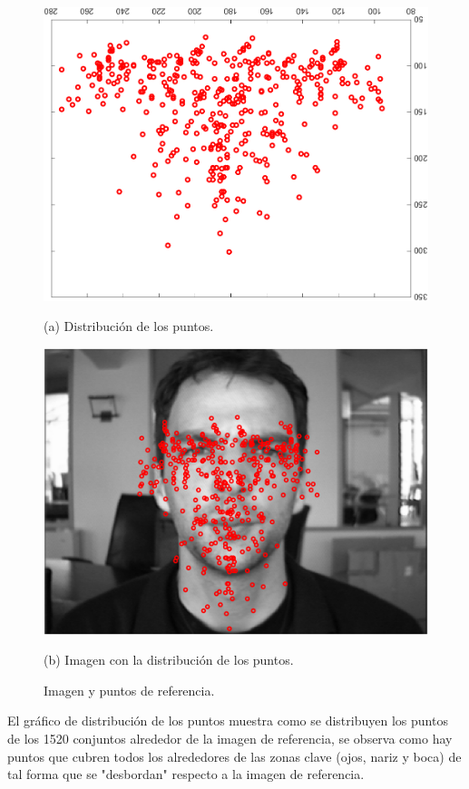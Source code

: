\documentclass[11pt, letterpaper]{article}
\begin{document}
\begin{figure}[h!]
	\centering
	\begin{minipage}{0.4\textwidth}
		\centering
		\includegraphics[width=\textwidth]{IMG/R2.png}
		\caption*{(a) Distribución de los puntos.}
	\end{minipage}\hfill
	\begin{minipage}{0.4\textwidth}
		\centering
		\includegraphics[width=\textwidth]{IMG/R3.png}
		\caption*{(b) Imagen con la distribución de los puntos.}
	\end{minipage}
	\caption{Imagen y puntos de referencia.}
	\label{fig:f2}
\end{figure}

El gráfico de distribución de los puntos muestra como se distribuyen los puntos de los 1520 conjuntos alrededor de la imagen de referencia, se observa como hay puntos que cubren todos los alrededores de las zonas clave (ojos, nariz y boca) de tal forma que se "desbordan" respecto a la imagen de referencia.
\end{document}

